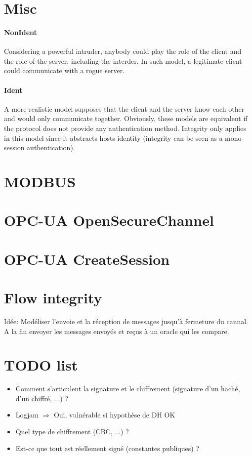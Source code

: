 \documentclass{article}
\newcommand{\opcua}{OPC-UA\xspace}
\newcommand{\modbus}{MODBUS\xspace}
\begin{document}
\section{Misc}

\paragraph{NonIdent} Considering a powerful intruder, anybody could play the role of the client and
the role of the server, including the interder.
In such model, a legitimate client could communicate with a rogue server.


\paragraph{Ident} A more realistic model supposes that the client and the server know each other
and would only communicate together.
Obviously, these models are equivalent if the protocol does not provide any
authentication method.
Integrity only applies in this model since it abstracts hosts identity
(integrity can be seen as a mono-session authentication).

\section{\modbus}


\section{\opcua OpenSecureChannel}


\section{\opcua CreateSession}


\section{Flow integrity}
Idée: Modéliser l'envoie et la réception de messages jusqu'à fermeture du cannal.
A la fin envoyer les messages envoyés et reçus à un oracle qui les compare.

\section{TODO list}

\begin{itemize}
    \item Comment s'articulent la signature et le chiffrement (signature d'un haché, d'un chiffré, ...) ?
    \item Logjam $\Rightarrow$ Oui, vulnérable si hypothèse de DH OK
    \item Quel type de chiffrement (CBC, ...) ?
    \item Est-ce que tout est réellement signé (constantes publiques) ?
\end{itemize}
\end{document}
